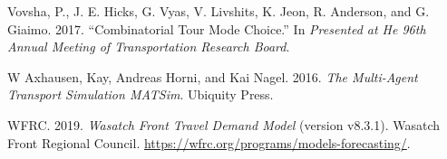 \documentclass[12pt, oneside, openright]{byuthesis}
\newlength{\cslhangindent}
\newlength{\cslentryspacingunit} %
\newenvironment{CSLReferences}[2] %
 {%
  \setlength{\parindent}{0pt}
  \ifodd #1
  \let\oldpar\par
  \def\par{\hangindent=\cslhangindent\oldpar}
  \fi
  \setlength{\parskip}{#2\cslentryspacingunit}
 }%
 {}
\begin{document}
\begin{CSLReferences}{1}{0}
\leavevmode{}%
Vovsha, P., J. E. Hicks, G. Vyas, V. Livshits, K. Jeon, R. Anderson, and G. Giaimo. 2017. {``Combinatorial Tour Mode Choice.''} In \emph{Presented at He 96th Annual Meeting of Transportation Research Board}.

\leavevmode{}%
W Axhausen, Kay, Andreas Horni, and Kai Nagel. 2016. \emph{The Multi-Agent Transport Simulation MATSim}. Ubiquity Press.

\leavevmode{}%
WFRC. 2019. \emph{Wasatch Front Travel Demand Model} (version v8.3.1). Wasatch Front Regional Council. \url{https://wfrc.org/programs/models-forecasting/}.

\end{CSLReferences}


\end{document}
